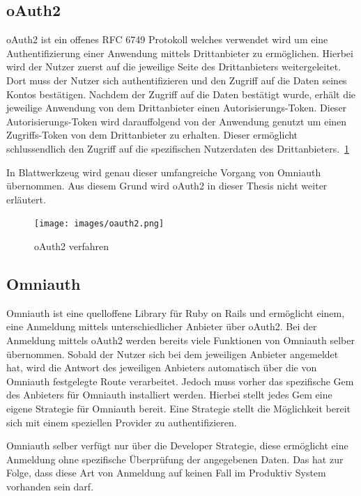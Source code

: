 \documentclass[paper=a4,fontsize=12pt,parskip=half]{scrartcl}
\begin{document}
	\subsection{oAuth2}
	\label{sec: oauth2}
	\gls{oAuth2} ist ein offenes \gls{RFC} 6749 Protokoll welches verwendet wird um eine Authentifizierung einer Anwendung mittels Drittanbieter zu ermöglichen. Hierbei wird der Nutzer zuerst auf die jeweilige Seite des Drittanbieters weitergeleitet. Dort muss der Nutzer sich authentifizieren und den Zugriff auf die Daten seines Kontos bestätigen. Nachdem der Zugriff auf die Daten bestätigt wurde, erhält die jeweilige Anwendung von dem Drittanbieter einen Autorisierungs-Token. Dieser Autorisierungs-Token wird darauffolgend von der Anwendung genutzt um einen Zugriffs-Token von dem Drittanbieter zu erhalten. Dieser ermöglicht schlussendlich den Zugriff auf die spezifischen Nutzerdaten des Drittanbieters.~\ref{fig:oauth2}
	
	In Blattwerkzeug wird genau dieser umfangreiche Vorgang von Omniauth übernommen. Aus diesem Grund wird oAuth2 in dieser Thesis nicht weiter erläutert.
	
	\begin{figure}[h]
		\texttt{[image: images/oauth2.png]}
		\caption{oAuth2 verfahren}
		\label{fig:oauth2}
	\end{figure}

	\subsection{Omniauth}
	\label{sec:omniauth}
	Omniauth ist eine quelloffene Library für Ruby on Rails und ermöglicht einem, eine Anmeldung mittels unterschiedlicher Anbieter über \gls{oAuth2}. Bei der Anmeldung mittels oAuth2 werden bereits viele Funktionen von Omniauth selber übernommen. Sobald der Nutzer sich bei dem jeweiligen Anbieter angemeldet hat, wird die Antwort des jeweiligen Anbieters automatisch über die von Omniauth festgelegte Route verarbeitet. Jedoch muss vorher das spezifische Gem des Anbieters für Omniauth installiert werden. Hierbei stellt jedes Gem eine eigene Strategie für Omniauth bereit. Eine Strategie stellt die Möglichkeit bereit sich mit einem speziellen Provider zu authentifizieren.
	
	Omniauth selber verfügt nur über die Developer Strategie, diese ermöglicht eine Anmeldung ohne spezifische Überprüfung der angegebenen Daten. Das hat zur Folge, dass diese Art von Anmeldung auf keinen Fall im Produktiv System vorhanden sein darf.
	
\end{document}
